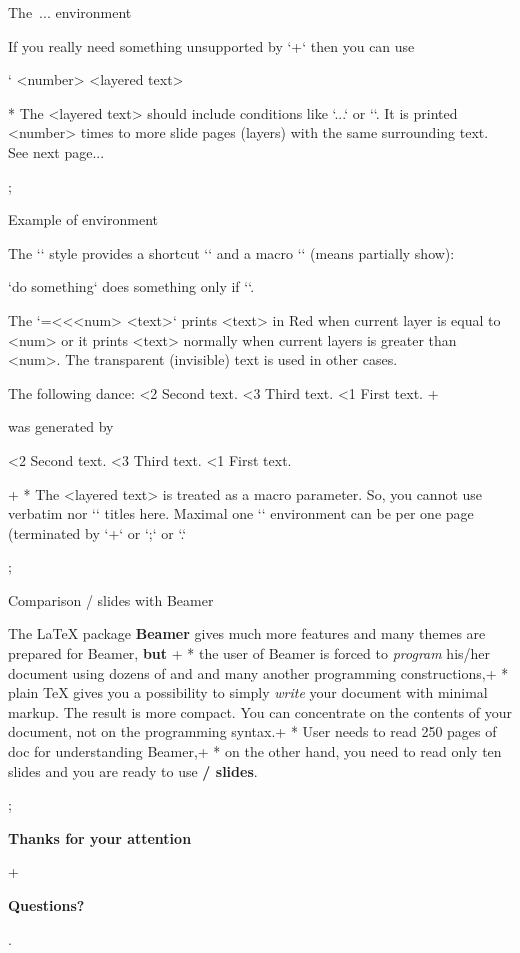 \sec The \code{\\layers}\,...\code{\\endlayers} environment

If you really need something unsupported by `\pg+` then you can use

\begtt \catcode`
\layers <number>
<layered text>
\endlayers
\endtt

* The <layered text> should include conditions like
  `\ifnum\layernum...` or `\ifcase\layernum`.
  It is printed <number> times to more slide pages (layers) with the same
  surrounding text. See next page...

\pg; %

\sec Example of \code{\\layers} environment

The `\slides` style provides a shortcut `\use` and a macro `\pshow` (means
partially show):

\begtt
\def\use#1#2{\ifnum\layernum#1\relax#2\fi}
\def\pshow#1{\use{=#1}\Red \use{<#1}\Transparent \ignorespaces}
\endtt
`\use{=3}{do something}` does something only if ``.

The `{\pshow<num> <text>}` prints <text> in Red when current layer is equal
to <num> or it prints <text> normally when current layers is greater than <num>.
The transparent (invisible) text is used in other cases.

The following dance:
{\pshow2 Second text.} {\pshow3 Third text.} {\pshow1 First text.}
\endlayers
\pg+

was generated by

\begtt
{}
{\pshow2 Second text.} {\pshow3 Third text.} {\pshow1 First text.}
\endlayers
\endtt

\pg+
* The <layered text> is treated as a macro parameter. So, you cannot use verbatim
  nor `\sec` titles here. Maximal one `\layers` environment can be per one
  page (terminated by `\pg+` or `\pg;` or `\pg.`

\pg; %

\sec Comparison \OpTeX/ slides with Beamer

The \LaTeX{} package {\bf\Blue Beamer} gives much more features and many themes
are prepared for Beamer, {\bf\Red but}
\pg+
* the user of Beamer is forced to {\em program} his/her document using
  dozens of \code{\\begin{foo}} and \code{\\end{foo}} and many another
  programming constructions,\pg+
* plain \TeX{} gives you a possibility to simply
  {\em write} your document with minimal markup. The result is more compact.
  You can concentrate on the contents of your document, not on the
  programming syntax.\pg+
* User needs to read 250 pages of doc for understanding Beamer,\pg+
* on the other hand, you need to read only ten
  slides
  and you are ready to use {\bf\Blue\OpTeX/ slides}.

\pg; %

\null
\vskip2cm
\centerline{\typosize[35/40]\bf Thanks for your attention}\pg+

\vskip2cm
\centerline{\Blue\typosize[60/70]\bf Questions?}

\pg. %

